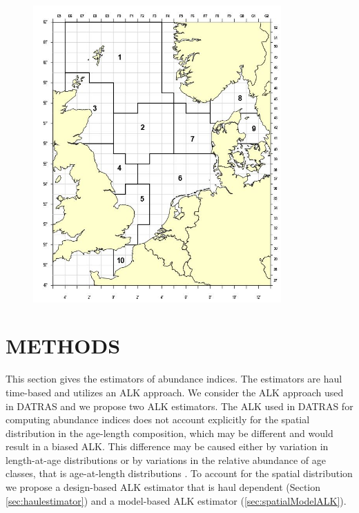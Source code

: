 \documentclass[a4paper 12pt]{article}
\numberwithin{equation}{section}
\begin{document}
\clearpage
\begin{figure}[h!]
  \centering
 {\includegraphics[width=9.5cm]{icesroundfishmap.jpg}}   
\end{figure}

\section{\large METHODS}
\label{sec:methods}
This section gives the estimators of abundance indices. The estimators are haul time-based and utilizes an ALK approach. We consider the ALK approach used in DATRAS and we propose two ALK estimators. The ALK used in DATRAS for computing abundance indices does not account explicitly for the spatial distribution in the age-length composition, which may be different and would result in a biased ALK. This difference may be caused either by variation in length-at-age distributions or by variations in the relative abundance of age classes, that is age-at-length distributions \citep{gerritsen2006simple}.  To account for the spatial distribution we propose a design-based ALK estimator that is haul dependent (Section \ref{sec:haulestimator}) and a model-based ALK estimator (\ref{sec:spatialModelALK}).
\end{document}
